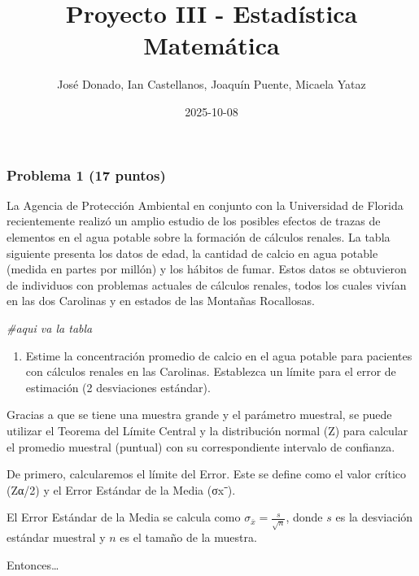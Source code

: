\documentclass[
]{article}
\title{Proyecto III - Estadística Matemática}
\author{José Donado, Ian Castellanos, Joaquín Puente, Micaela Yataz}
\date{2025-10-08}
\newenvironment{Shaded}{\begin{snugshade}}{\end{snugshade}}
\newcommand{\CommentTok}[1]{\textcolor[rgb]{0.56,0.35,0.01}{\textit{#1}}}
\providecommand{\tightlist}{%
  \setlength{\itemsep}{0pt}\setlength{\parskip}{0pt}}
\begin{document}
\maketitle

\hypertarget{problema-1-17-puntos}{%
\subsubsection{Problema 1 (17 puntos)}\label{problema-1-17-puntos}}

La Agencia de Protección Ambiental en conjunto con la Universidad de
Florida recientemente realizó un amplio estudio de los posibles efectos
de trazas de elementos en el agua potable sobre la formación de cálculos
renales. La tabla siguiente presenta los datos de edad, la cantidad de
calcio en agua potable (medida en partes por millón) y los hábitos de
fumar. Estos datos se obtuvieron de individuos con problemas actuales de
cálculos renales, todos los cuales vivían en las dos Carolinas y en
estados de las Montañas Rocallosas.

\begin{Shaded}
\begin{Highlighting}[]
\CommentTok{\#aqui va la tabla}
\end{Highlighting}
\end{Shaded}

\begin{enumerate}
\def\labelenumi{\alph{enumi})}
\tightlist
\item
  Estime la concentración promedio de calcio en el agua potable para
  pacientes con cálculos renales en las Carolinas. Establezca un límite
  para el error de estimación (2 desviaciones estándar).
\end{enumerate}

Gracias a que se tiene una muestra grande y el parámetro muestral, se
puede utilizar el Teorema del Límite Central y la distribución normal
(Z) para calcular el promedio muestral (puntual) con su correspondiente
intervalo de confianza.

De primero, calcularemos el límite del Error. Este se define como el
valor crítico (Zα/2\hspace{0pt}) y el Error Estándar de la Media
(σxˉ\hspace{0pt}).

El Error Estándar de la Media se calcula como
\(\sigma_{\bar{x}} = \frac{s}{\sqrt{n}}\), donde \(s\) es la desviación
estándar muestral y \(n\) es el tamaño de la muestra.

Entonces\ldots{}
\end{document}
